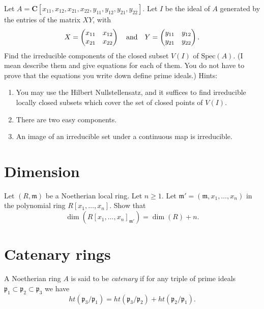 \begin{exercise}
\label{exercise-product-matrices-ring}
Let $A =
{\mathbf C}[x_{11}, x_{12}, x_{21}, x_{22}, y_{11}, y_{12}, y_{21}, y_{22}]$.
Let $I$ be the ideal of $A$ generated by the entries of the
matrix $XY$, with
$$
X = \left(
\begin{matrix}
x_{11} & x_{12}\\
x_{21} & x_{22}
\end{matrix}
\right)
\quad \hbox{and} \quad
Y = \left(
\begin{matrix}
y_{11} & y_{12}\\
y_{21} & y_{22}
\end{matrix}
\right).
$$
Find the irreducible components of the closed subset $V(I)$ of
$\text{Spec}(A)$.
(I mean describe them and give equations for each of them. You do not have
to prove that the equations you write down define prime ideals.) Hints:
\begin{enumerate}
\item You may use the Hilbert Nullstellensatz, and it suffices to find
irreducible locally closed subsets which cover the set of closed points of
$V(I)$.
\item There are two easy components.
\item An image of an irreducible set under a continuous map is
irreducible.
\end{enumerate}
\end{exercise}




\section{Dimension}
\label{section-dimension}

\begin{exercise}
\label{exercise-dimension-polynomial-ring}
Let $(R, \mathfrak m)$ be a Noetherian local ring.
Let $n \geq 1$. Let $\mathfrak m' = (\mathfrak m, x_1, \ldots, x_n)$
in the polynomial ring $R[x_1, \ldots, x_n]$.
Show that
$$
\dim(R[x_1, \ldots, x_n]_{\mathfrak m'}) = \dim(R) + n.
$$
\end{exercise}





\section{Catenary rings}
\label{section-catenary}

\begin{definition}
\label{definition-catenary}
A Noetherian ring $A$ is said to be {\it catenary}
if for any triple of prime ideals
${\mathfrak p}_1 \subset {\mathfrak p}_2 \subset {\mathfrak p}_3$
we have
$$
ht({\mathfrak p}_3 / {\mathfrak p}_1) = ht({\mathfrak p}_3/{\mathfrak p}_2) +
ht({\mathfrak p}_2/{\mathfrak p}_1).
$$
\end{definition}

